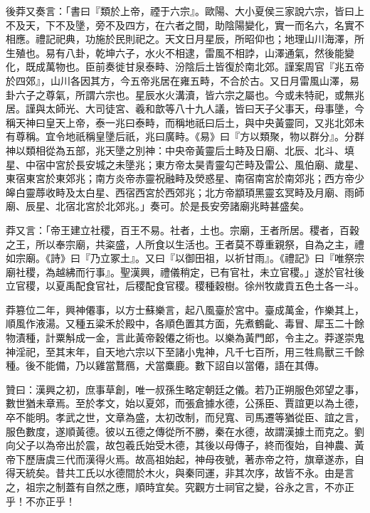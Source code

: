 \begin{pinyinscope}
後莽又奏言：「書曰『類於上帝，禋于六宗』。歐陽、大小夏侯三家說六宗，皆曰上不及天，下不及墬，旁不及四方，在六者之間，助陰陽變化，實一而名六，名實不相應。禮記祀典，功施於民則祀之。天文日月星辰，所昭仰也；地理山川海澤，所生殖也。易有八卦，乾坤六子，水火不相逮，雷風不相誖，山澤通氣，然後能變化，既成萬物也。臣前奏徙甘泉泰畤、汾陰后土皆復於南北郊。謹案周官『兆五帝於四郊』，山川各因其方，今五帝兆居在雍五畤，不合於古。又日月雷風山澤，易卦六子之尊氣，所謂六宗也。星辰水火溝瀆，皆六宗之屬也。今或未特祀，或無兆居。謹與太師光、大司徒宮、羲和歆等八十九人議，皆曰天子父事天，母事墬，今稱天神曰皇天上帝，泰一兆曰泰畤，而稱地祇曰后土，與中央黃靈同，又兆北郊未有尊稱。宜令地祇稱皇墬后祇，兆曰廣畤。《易》曰『方以類聚，物以群分』。分群神以類相從為五部，兆天墬之別神：中央帝黃靈后土畤及日廟、北辰、北斗、填星、中宿中宮於長安城之未墬兆；東方帝太昊青靈勾芒畤及雷公、風伯廟、歲星、東宿東宮於東郊兆；南方炎帝赤靈祝融畤及熒惑星、南宿南宮於南郊兆；西方帝少皞白靈蓐收畤及太白星、西宿西宮於西郊兆；北方帝顓頊黑靈玄冥畤及月廟、雨師廟、辰星、北宿北宮於北郊兆。」奏可。於是長安旁諸廟兆畤甚盛矣。

莽又言：「帝王建立社稷，百王不易。社者，土也。宗廟，王者所居。稷者，百穀之王，所以奉宗廟，共粢盛，人所食以生活也。王者莫不尊重親祭，自為之主，禮如宗廟。《詩》曰『乃立冢土』。又曰『以御田祖，以祈甘雨』。《禮記》曰『唯祭宗廟社稷，為越紼而行事』。聖漢興，禮儀稍定，已有官社，未立官稷。」遂於官社後立官稷，以夏禹配食官社，后稷配食官稷。稷種穀樹。徐州牧歲貢五色土各一斗。

莽篡位二年，興神僊事，以方士蘇樂言，起八風臺於宮中。臺成萬金，作樂其上，順風作液湯。又種五粱禾於殿中，各順色置其方面，先煮鶴齔、毒冒、犀玉二十餘物漬種，計粟斛成一金，言此黃帝穀僊之術也。以樂為黃門郎，令主之。莽遂崇鬼神淫祀，至其末年，自天地六宗以下至諸小鬼神，凡千七百所，用三牲鳥獸三千餘種。後不能備，乃以雞當鶩鴈，犬當麋鹿。數下詔自以當僊，語在其傳。

贊曰：漢興之初，庶事草創，唯一叔孫生略定朝廷之儀。若乃正朔服色郊望之事，數世猶未章焉。至於孝文，始以夏郊，而張倉據水德，公孫臣、賈誼更以為土德，卒不能明。孝武之世，文章為盛，太初改制，而兒寬、司馬遷等猶從臣、誼之言，服色數度，遂順黃德。彼以五德之傳從所不勝，秦在水德，故謂漢據土而克之。劉向父子以為帝出於震，故包羲氏始受木德，其後以母傳子，終而復始，自神農、黃帝下歷唐虞三代而漢得火焉。故高祖始起，神母夜號，著赤帝之符，旗章遂赤，自得天統矣。昔共工氏以水德間於木火，與秦同運，非其次序，故皆不永。由是言之，祖宗之制蓋有自然之應，順時宜矣。究觀方士祠官之變，谷永之言，不亦正乎！不亦正乎！


\end{pinyinscope}